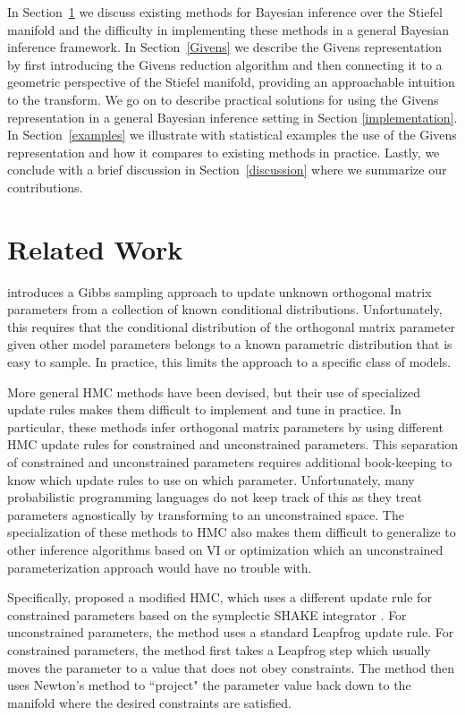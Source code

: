 \documentclass[ba]{imsart}
\numberwithin{equation}{section}
\theoremstyle{plain}
\begin{document}
\noindent In Section~\ref{related} we discuss existing methods for Bayesian inference over the Stiefel manifold and the difficulty in implementing these methods in a general Bayesian inference framework. In Section~\ref{Givens} we describe the Givens representation by first introducing the Givens reduction algorithm and then connecting it to a geometric perspective of the Stiefel manifold, providing an approachable intuition to the transform. We go on to describe practical solutions for using the Givens representation in a general Bayesian inference setting in Section \ref{implementation}. In Section~\ref{examples} we illustrate with statistical examples the use of the Givens representation and how it compares to existing methods in practice. Lastly, we conclude with a brief discussion in Section~\ref{discussion} where we summarize our contributions.

\section{Related Work} \label{related}
\cite{hoff2009simulation} introduces a Gibbs sampling approach to update unknown orthogonal matrix parameters from a collection of known conditional distributions. Unfortunately, this requires that the conditional distribution of the orthogonal matrix parameter given other model parameters belongs to a known parametric distribution that is easy to sample. In practice, this limits the approach to a specific class of models.

\noindent More general HMC methods have been devised, but their use of specialized update rules makes them difficult to implement and tune in practice. In particular, these methods infer orthogonal matrix parameters by using different HMC update rules for constrained and unconstrained parameters. This separation of constrained and unconstrained parameters requires additional book-keeping to know which update rules to use on which parameter. Unfortunately, many probabilistic programming languages do not keep track of this as they treat parameters agnostically by transforming to an unconstrained space. The specialization of these methods to HMC also makes them difficult to generalize to other inference algorithms based on VI or optimization which an unconstrained parameterization approach would have no trouble with.

\noindent Specifically, \cite{brubaker2012family} proposed a modified HMC, which uses a different update rule for constrained parameters based on the symplectic SHAKE integrator \citep{leimkuhler2004simulating}. For unconstrained parameters, the method uses a standard Leapfrog update rule. For constrained parameters, the method first takes a Leapfrog step which usually moves the parameter to a value that does not obey constraints. The method then uses Newton's method to ``project" the parameter value back down to the manifold where the desired constraints are satisfied.
\end{document}

